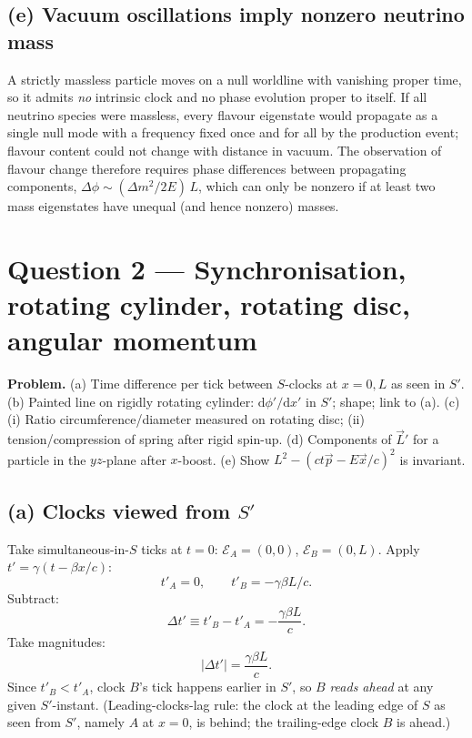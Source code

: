 \documentclass[11pt]{article}
\newcommand{\de}{\mathrm{d}}
\begin{document}
\subsection*{(e) Vacuum oscillations imply nonzero neutrino mass}

A strictly massless particle moves on a null worldline with vanishing proper time, so it admits \emph{no} intrinsic clock and no phase evolution proper to itself. If all neutrino species were massless, every flavour eigenstate would propagate as a single null mode with a frequency fixed once and for all by the production event; flavour content could not change with distance in vacuum. The observation of flavour change therefore requires phase differences between propagating components, $\Delta\phi\sim(\Delta m^{2}/2E)\,L$, which can only be nonzero if at least two mass eigenstates have unequal (and hence nonzero) masses.

\section*{Question 2 --- Synchronisation, rotating cylinder, rotating disc, angular momentum}

\textbf{Problem.} (a) Time difference per tick between $S$-clocks at $x=0,L$ as seen in $S'$. (b) Painted line on rigidly rotating cylinder: $\de\phi'/\de x'$ in $S'$; shape; link to (a). (c)(i) Ratio circumference/diameter measured on rotating disc; (ii) tension/compression of spring after rigid spin-up. (d) Components of $\vec L'$ for a particle in the $yz$-plane after $x$-boost. (e) Show $L^{2}-(ct\vec p-E\vec x/c)^{2}$ is invariant.

\subsection*{(a) Clocks viewed from $S'$}

Take simultaneous-in-$S$ ticks at $t=0$: $\mathcal E_{A}=(0,0)$, $\mathcal E_{B}=(0,L)$. Apply $t'=\gamma(t-\beta x/c)$:
\[ t'_{A}=0,\qquad t'_{B}=-\gamma\beta L/c. \]
Subtract:
\[ \Delta t'\equiv t'_{B}-t'_{A}=-\frac{\gamma\beta L}{c}. \]
Take magnitudes:
\begin{equation}
\boxed{\;|\Delta t'|=\frac{\gamma\beta L}{c}.\;}
\end{equation}
Since $t'_{B}<t'_{A}$, clock $B$'s tick happens earlier in $S'$, so $B$ \emph{reads ahead} at any given $S'$-instant. (Leading-clocks-lag rule: the clock at the leading edge of $S$ as seen from $S'$, namely $A$ at $x=0$, is behind; the trailing-edge clock $B$ is ahead.)
\end{document}
